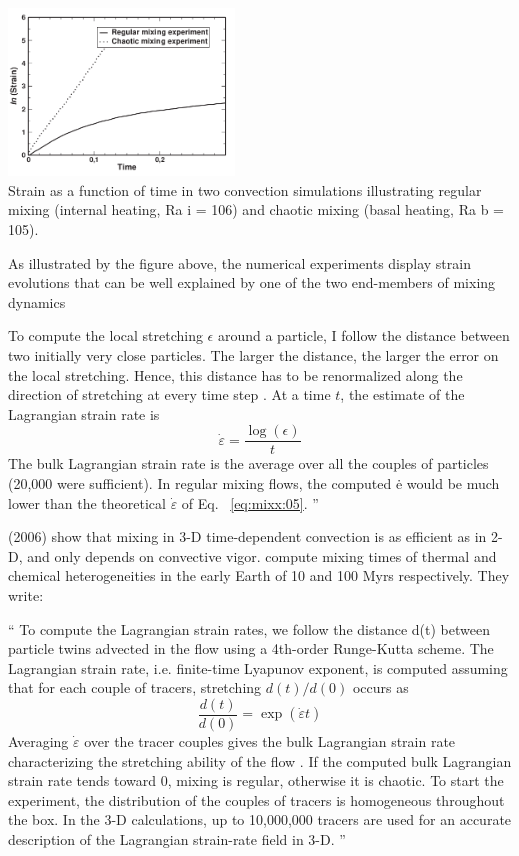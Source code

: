 \begin{displayquote}
{\begin{center}
\includegraphics[width=6cm]{images/mixing/colt05}\\
Strain as a function of time in two convection simulations
illustrating regular mixing (internal heating, Ra i = 106) and chaotic
mixing (basal heating, Ra b = 105).
\end{center}


As illustrated by the figure above, the numerical
experiments display strain evolutions that can be well
explained by one of the two end-members of mixing
dynamics

To compute the local stretching $\epsilon$ around a particle,
I follow the distance between two initially very close
particles. The larger the distance, the larger the error
on the local stretching. Hence, this distance has to be
renormalized along the direction of stretching at every
time step \cite{feri98}. At a time $t$, the estimate of the
Lagrangian strain rate is
\[
\dot\varepsilon = \frac{\log (\epsilon)}{t}
\]
The bulk Lagrangian strain rate is the average over
all the couples of particles (20,000 were sufficient). In
regular mixing flows, the computed ė would be much
lower than the theoretical $\dot{\varepsilon}$ of Eq.~
\eqref{eq:mixx:05}.
''
}
\end{displayquote}



\textcite{cosc06} (2006)
show that mixing in 3-D time-dependent convection is as efficient as
in 2-D, and only depends on convective vigor.
compute mixing times of thermal and chemical heterogeneities in
the early Earth of 10 and 100 Myrs respectively.
They write:
\begin{displayquote}
{\color{darkgray}
``
To compute the Lagrangian strain rates, we follow the
distance d(t) between particle twins advected in the flow
using a 4th-order Runge-Kutta scheme. The Lagrangian
strain rate, i.e. finite-time Lyapunov exponent, is computed
assuming that for each couple of tracers, stretching $d(t)/d(0)$
occurs as
\[
\frac{d(t)}{d(0)} = \exp ( \dot\varepsilon t)
\]
Averaging $\dot{\varepsilon}$ over the tracer couples gives the bulk
Lagrangian strain rate characterizing the stretching ability
of the flow \cite{colt05}. If the computed bulk
Lagrangian strain rate tends toward 0, mixing is regular,
otherwise it is chaotic. To start the experiment, the
distribution of the couples of tracers is homogeneous
throughout the box. In the 3-D calculations, up to
10,000,000 tracers are used for an accurate description of
the Lagrangian strain-rate field in 3-D.
''
}
\end{displayquote}

